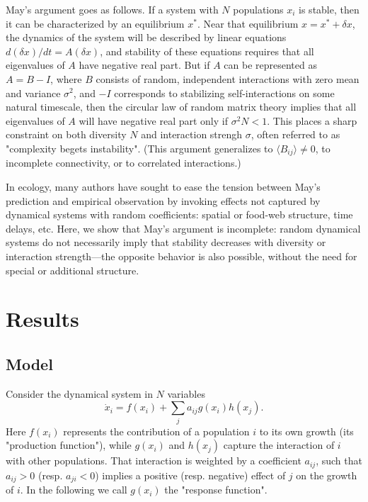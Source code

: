 \documentclass[%
 reprint,
 amsmath,amssymb,
 aps,
]{revtex4-2}
\begin{document}
May's argument goes as follows. If a system with $N$ populations $x_i$ is stable, then it can be characterized by an equilibrium $x^*$. Near that equilibrium $x = x^* + \delta x$, the dynamics of the system will be described by linear equations $d(\delta x)/dt = A (\delta x)$, and stability of these equations requires that all eigenvalues of $A$ have negative real part. But if $A$ can be represented as $A = B - I$, where $B$ consists of random, independent interactions with zero mean and variance $\sigma^2$, and $-I$ corresponds to stabilizing self-interactions on some natural timescale, then the circular law of random matrix theory implies that all eigenvalues of $A$ will have negative real part only if $\sigma^2 N < 1$. This places a sharp constraint on both diversity $N$ and interaction strengh $\sigma$, often referred to as "complexity begets instability". (This argument generalizes to $\langle B_{ij}\rangle \neq 0$, to incomplete connectivity, or to correlated interactions.)
 
In ecology, many authors have sought to ease the tension between May's prediction and empirical observation by invoking effects not captured by dynamical systems with random coefficients: spatial or food-web structure, time delays, etc. Here, we show that May's argument is incomplete: random dynamical systems do not necessarily imply that stability decreases with diversity or interaction strength---the opposite behavior is also possible, without the need for special or additional structure. 

\section{Results}

\subsection{Model}

Consider the dynamical system in $N$ variables
\begin{equation}\label{dynamics}
    \dot{x}_i = f(x_i) + \sum_{j}a_{ij}g(x_i)h(x_j).
\end{equation}
Here $f(x_i)$ represents the contribution of a population $i$ to its own growth (its "production function"), while $g(x_i)$ and $h(x_j)$ capture the interaction of $i$ with other populations. That interaction is weighted by a coefficient $a_{ij}$, such that $a_{ij} > 0$ (resp. $a_{ji} < 0$) implies a positive (resp. negative) effect of $j$ on the growth of $i$. In the following we call $g(x_i)$ the "response function". 
\end{document}
